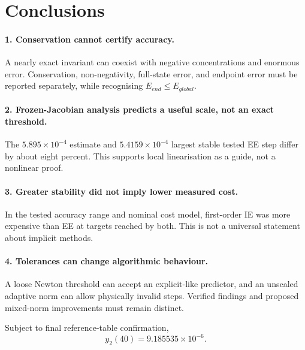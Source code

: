 \section{Conclusions}
\paragraph{1. Conservation cannot certify accuracy.} A nearly exact invariant can coexist with negative concentrations and enormous error. Conservation, non-negativity, full-state error, and endpoint error must be reported separately, while recognising $E_{end}\le E_{global}$.

\paragraph{2. Frozen-Jacobian analysis predicts a useful scale, not an exact threshold.} The $5.895\times10^{-4}$ estimate and $5.4159\times10^{-4}$ largest stable tested EE step differ by about eight percent. This supports local linearisation as a guide, not a nonlinear proof.

\paragraph{3. Greater stability did not imply lower measured cost.} In the tested accuracy range and nominal cost model, first-order IE was more expensive than EE at targets reached by both. This is not a universal statement about implicit methods.

\paragraph{4. Tolerances can change algorithmic behaviour.} A loose Newton threshold can accept an explicit-like predictor, and an unscaled adaptive norm can allow physically invalid steps. Verified findings and proposed mixed-norm improvements must remain distinct.

Subject to final reference-table confirmation,
\[
\boxed{y_2(40)=9.185535\times10^{-6}}.
\]


